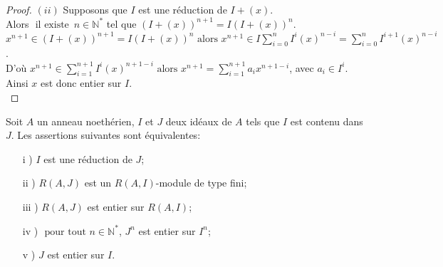 \begin{proof}
	$(ii)$ Supposons que $I$ est une réduction de $I + (x)$.\\
	Alors $\text{ il existe } \, n \in \mathbb{N^*}$ tel que $(I + (x))^{n+1} = I(I + (x))^{n}$.\\
	$x^{n+1} \in (I + (x))^{n+1} = I(I + (x))^{n} \text{ alors } x^{n+1} \in I\displaystyle \sum_{i=0}^{n}{I^i (x)^{n-i}} = \displaystyle \sum_{i=0}^{n}{I^{i+1} (x)^{n-i}}$.\\
	D'où $x^{n+1} \in \displaystyle \sum_{i=1}^{n+1}{I^i (x)^{n+1-i}} \text{ alors } x^{n+1} =  \displaystyle \sum_{i=1}^{n+1}{a_i x^{n+1-i}}$, avec $a_i \in I^i$. Ainsi $x$ est donc entier sur $I$.\\
\end{proof}
\begin{maproposition}
	Soit $A$ un anneau noethérien, $I$ et $J$ deux idéaux de $A$ tels que $I $ est contenu dans $ J$. Les assertions suivantes sont équivalentes: 
	\begin{enumerate}
		\item[i] ) $I$ est une réduction de $J$;
		\item[ii] ) $R(A,J)$ est un $R(A,I)$-module de type fini;
		\item[iii] ) $R(A,J)$ est entier sur $R(A,I)$;
		\item[iv] ) $\text{ pour tout } n \in \mathbb{N^*}$, $J^n$ est entier sur $I^n$;
		\item[v] ) $J$ est entier sur $I$.
	\end{enumerate}
\end{maproposition}
